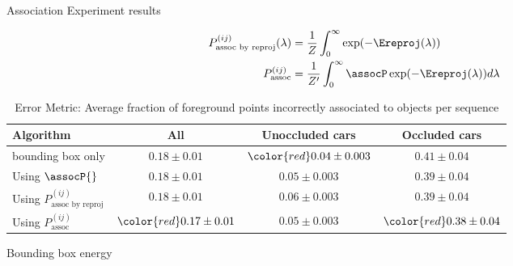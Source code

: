 \begin{frame}{Association Experiment results}

\begin{align}
  P^{(ij)}_{\text{assoc by reproj}}(\lambda) &= \frac{1}{Z}\int_0^{\infty}\exp(-\Ereproj(\lambda))\\
  P^{(ij)}_{\text{assoc}} &= \frac{1}{Z'}\int_0^{\infty} \assocP \exp(-\Ereproj(\lambda))d\lambda
  \label{eq:prob-assoc}
\end{align}

\begin{table}
  \centering
  \begin{tabular}{lccc}
    \toprule
    Algorithm & All & Unoccluded cars & Occluded cars \\
    \midrule
    bounding box only                         & $0.18\pm0.01$          & $\color{red}0.04\pm0.003$  & $0.41\pm0.04$\\
    Using $\assocP{}$                         & $0.18\pm0.01$          & $0.05\pm0.003$           & $0.39\pm0.04$ \\
    Using $P^{(ij)}_{\text{assoc by reproj}}$ & $0.18\pm0.01$          & $0.06\pm0.003$           & $0.39\pm0.04$\\
    Using $P^{(ij)}_{\text{assoc}}$           & $\color{red}0.17\pm0.01$ & $0.05\pm0.003$           & $\color{red}0.38\pm0.04$\\
    \bottomrule
  \end{tabular}
  \caption{Error Metric: Average fraction of foreground points incorrectly associated to objects per sequence}
\end{table}
\end{frame}

\begin{frame}{Bounding box energy}
  \centering
  \begin{figure}
  
  \end{figure}
\end{frame}

